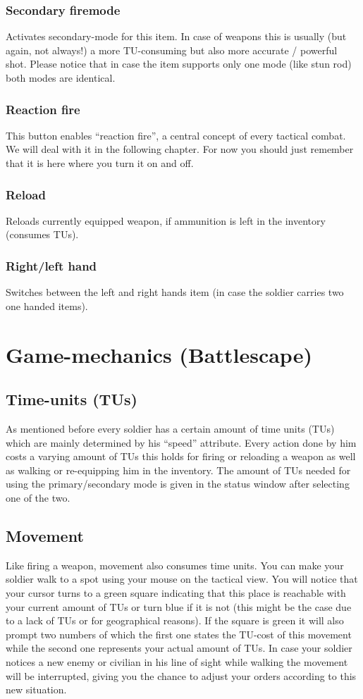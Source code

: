 \subsubsection{Secondary firemode}
Activates secondary-mode for this item. In case of weapons this is usually (but again, not always!) a more TU-consuming but also more accurate / powerful shot. Please notice that in case the item supports only one mode (like stun rod) both modes are identical.
\subsubsection{Reaction fire}
This button enables ``reaction fire'', a central concept of every tactical combat. We will deal with it in the following chapter. For now you should just remember that it is here where you turn it on and off.
\subsubsection{Reload}
Reloads currently equipped weapon, if ammunition is left in the inventory (consumes TUs).
\subsubsection{Right/left hand}
Switches between the left and right hands item (in case the soldier carries two one handed items).

\section{Game-mechanics (Battlescape)}

\subsection{Time-units (TUs)}
As mentioned before every soldier has a certain amount of time units (TUs) which are mainly determined by his ``speed'' attribute. Every action done by him costs a varying amount of TUs this holds for firing or reloading a weapon as well as walking or re-equipping him in the inventory. The amount of TUs needed for using the primary/secondary mode is given in the status window after selecting one of the two.

\subsection{Movement}
Like firing a weapon, movement also consumes time units. You can make your soldier walk to a spot using your mouse on the tactical view. You will notice that your cursor turns to a green square indicating that this place is reachable with your current amount of TUs or turn blue if it is not (this might be the case due to a lack of TUs or for geographical reasons). If the square is green it will also prompt two numbers of which the first one states the TU-cost of this movement while the second one represents your actual amount of TUs. In case your soldier notices a new enemy or civilian in his line of sight while walking the movement will be interrupted, giving you the chance to adjust your orders according to this new situation.

